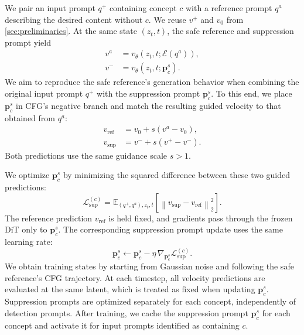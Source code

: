We pair an input prompt $q^+$ containing concept $c$ with a reference prompt $q^a$ describing the desired content without $c$.
We reuse $v^+$ and $v_0$ from \cref{sec:preliminaries}.
At the same state $(z_t,t)$, the safe reference and suppression prompt yield
\begin{equation}
    \begin{aligned}
        v^a &= v_\theta(z_t,t;\mathcal E(q^a)),\\
        v^- &= v_\theta(z_t,t;\mathbf p_c^s).
    \end{aligned}
    \label{eq:suppression_velocities}
\end{equation}
We aim to reproduce the safe reference's generation behavior when combining the original input prompt $q^+$ with the suppression prompt $\mathbf p_c^s$.
To this end, we place $\mathbf p_c^s$ in CFG's negative branch and match the resulting guided velocity to that obtained from $q^a$:
\begin{equation}
    \begin{aligned}
        v_{\mathrm{ref}} &= v_0+s(v^a-v_0),\\
        v_{\mathrm{sup}} &= v^-+s(v^+-v^-).
    \end{aligned}
    \label{eq:suppression_guidance}
\end{equation}
Both predictions use the same guidance scale $s>1$.

We optimize $\mathbf p_c^s$ by minimizing the squared difference between these two guided predictions:
\begin{equation}
    \mathcal L_{\mathrm{sup}}^{(c)}
    =\mathbb E_{(q^+,q^a),z_t,t}\!\left[
    \left\|v_{\mathrm{sup}}-v_{\mathrm{ref}}\right\|_2^2
    \right].
    \label{eq:suppression_objective}
\end{equation}
The reference prediction $v_{\mathrm{ref}}$ is held fixed, and gradients pass through the frozen DiT only to $\mathbf p_c^s$.
The corresponding suppression prompt update uses the same learning rate:
\begin{equation}
    \mathbf p_c^s \leftarrow \mathbf p_c^s
    -\eta\,\nabla_{\mathbf p_c^s}\mathcal L_{\mathrm{sup}}^{(c)}.
    \label{eq:suppression_update}
\end{equation}
We obtain training states by starting from Gaussian noise and following the safe reference's CFG trajectory.
At each timestep, all velocity predictions are evaluated at the same latent, which is treated as fixed when updating $\mathbf p_c^s$.
Suppression prompts are optimized separately for each concept, independently of detection prompts.
After training, we cache the suppression prompt $\mathbf p_c^s$ for each concept and activate it for input prompts identified as containing $c$.

